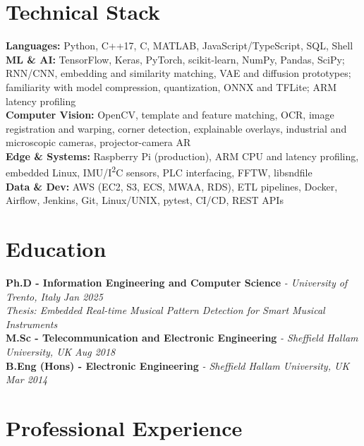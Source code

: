 \documentclass[11pt]{article}
\begin{document}
\section*{Technical Stack}

\textbf{Languages:} Python, C++17, C, MATLAB, JavaScript/TypeScript, SQL, Shell\\
\textbf{ML \& AI:} TensorFlow, Keras, PyTorch, scikit-learn, NumPy, Pandas, SciPy; RNN/CNN, embedding and similarity matching, VAE and diffusion prototypes; familiarity with model compression, quantization, ONNX and TFLite; ARM latency profiling\\
\textbf{Computer Vision:} OpenCV, template and feature matching, OCR, image registration and warping, corner detection, explainable overlays, industrial and microscopic cameras, projector-camera AR\\
\textbf{Edge \& Systems:} Raspberry Pi (production), ARM CPU and latency profiling, embedded Linux, IMU/I\textsuperscript{2}C sensors, PLC interfacing, FFTW, libsndfile\\
\textbf{Data \& Dev:} AWS (EC2, S3, ECS, MWAA, RDS), ETL pipelines, Docker, Airflow, Jenkins, Git, Linux/UNIX, pytest, CI/CD, REST APIs

\section*{Education}
\textbf{Ph.D - Information Engineering and Computer Science} \textit{\small{ - University of Trento, Italy}} \hfill \textit{Jan 2025}\\[2pt]
\noindent\textit{\small Thesis: Embedded Real-time Musical Pattern Detection for Smart Musical Instruments}\\[3pt]
\noindent\textbf{M.Sc - Telecommunication and Electronic Engineering} \textit{\small{ - Sheffield Hallam University, UK}} \hfill \textit{Aug 2018}\\[3pt]
\noindent\textbf{B.Eng (Hons) - Electronic Engineering} \textit{\small{ - Sheffield Hallam University, UK}} \hfill \textit{Mar 2014}

\section*{Professional Experience}
\end{document}
